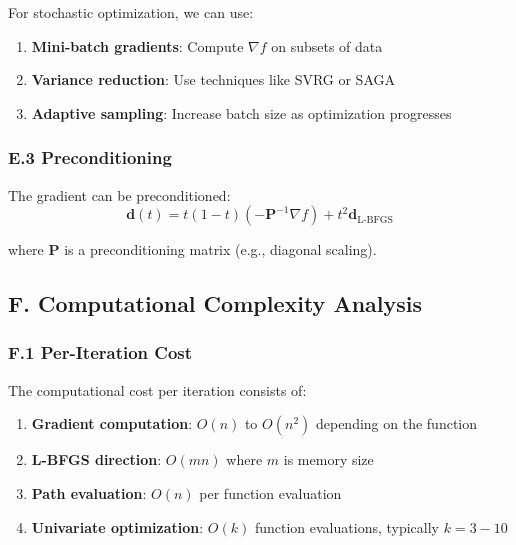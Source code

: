 For stochastic optimization, we can use:

\begin{enumerate}
\def\labelenumi{\arabic{enumi}.}
\tightlist
\item
  \textbf{Mini-batch gradients}: Compute \(\nabla f\) on subsets of data
\item
  \textbf{Variance reduction}: Use techniques like SVRG or SAGA
\item
  \textbf{Adaptive sampling}: Increase batch size as optimization progresses
\end{enumerate}

\hypertarget{e.3-preconditioning}{%
\subsubsection{E.3 Preconditioning}\label{e.3-preconditioning}}

The gradient can be preconditioned:
\[\mathbf{d}(t) = t(1-t)(-\mathbf{P}^{-1}\nabla f) + t^2 \mathbf{d}_{\text{L-BFGS}}\]

where \(\mathbf{P}\) is a preconditioning matrix (e.g., diagonal scaling).

\hypertarget{f.-computational-complexity-analysis}{%
\subsection{F. Computational Complexity Analysis}\label{f.-computational-complexity-analysis}}

\hypertarget{f.1-per-iteration-cost}{%
\subsubsection{F.1 Per-Iteration Cost}\label{f.1-per-iteration-cost}}

The computational cost per iteration consists of:

\begin{enumerate}
\def\labelenumi{\arabic{enumi}.}
\tightlist
\item
  \textbf{Gradient computation}: \(O(n)\) to \(O(n^2)\) depending on the function
\item
  \textbf{L-BFGS direction}: \(O(mn)\) where \(m\) is memory size
\item
  \textbf{Path evaluation}: \(O(n)\) per function evaluation
\item
  \textbf{Univariate optimization}: \(O(k)\) function evaluations, typically \(k = 3-10\)
\end{enumerate}

